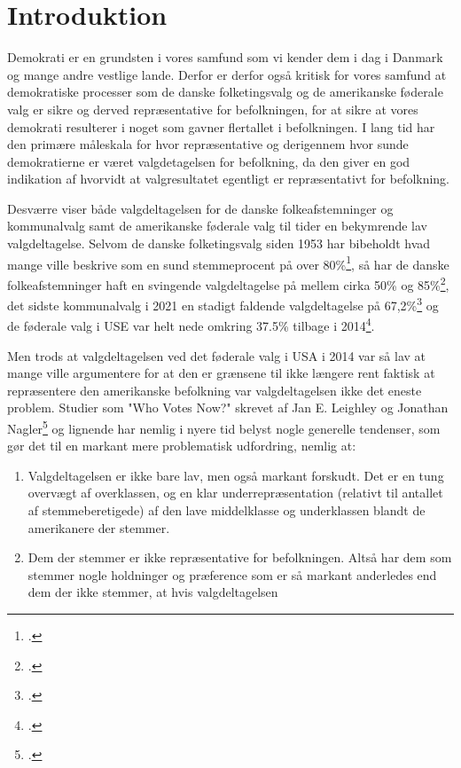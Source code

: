 \documentclass[a4paper, 8pt, oneside]{article} %
\begin{document}
\newpage

\section{Introduktion}
\label{Introduktion}
Demokrati er en grundsten i vores samfund som vi kender dem i dag i Danmark og mange andre vestlige lande. Derfor er derfor også kritisk for vores samfund at demokratiske processer som de danske folketingsvalg og de amerikanske føderale valg er sikre og derved repræsentative for befolkningen, for at sikre at vores demokrati resulterer i noget som gavner flertallet i befolkningen. I lang tid har den primære måleskala for hvor repræsentative og derigennem hvor sunde demokratierne er været valgdetagelsen for befolkning, da den giver en god indikation af hvorvidt at valgresultatet egentligt er repræsentativt for befolkning.

Desværre viser både valgdeltagelsen for de danske folkeafstemninger og kommunalvalg samt de amerikanske føderale valg til tider en bekymrende lav valgdeltagelse. Selvom de danske folketingsvalg siden 1953 har bibeholdt hvad mange ville beskrive som en sund stemmeprocent på over 80\%\footcite{clemmensen_folketingsvalgene_nodate}, så har de danske folkeafstemninger haft en svingende valgdeltagelse på mellem cirka 50\% og 85\%\footcite{clemmensen_folkeafstemninger_1953}, det sidste kommunalvalg i 2021 en stadigt faldende valgdeltagelse på 67,2\%\footcite{november_2021_stemmeprocent_2021} og de føderale valg i USE var helt nede omkring 37.5\% tilbage i 2014\footcite{noauthor_voter_nodate}.

Men trods at valgdeltagelsen ved det føderale valg i USA i 2014 var så lav at mange ville argumentere for at den er grænsene til ikke længere rent faktisk at repræsentere den amerikanske befolkning var valgdeltagelsen ikke det eneste problem. Studier som "Who Votes Now?" skrevet af Jan E. Leighley og Jonathan Nagler\footcite{leighley_who_2013} og lignende har nemlig i nyere tid belyst nogle generelle tendenser, som gør det til en markant mere problematisk udfordring, nemlig at:

\begin{enumerate}
	\item Valgdeltagelsen er ikke bare lav, men også markant forskudt. Det er en tung overvægt af overklassen, og en klar underrepræsentation (relativt til antallet af stemmeberetigede) af den lave middelklasse og underklassen blandt de amerikanere der stemmer.
	\item Dem der stemmer er ikke repræsentative for befolkningen. Altså har dem som stemmer nogle holdninger og præference som er så markant anderledes end dem der ikke stemmer, at hvis valgdeltagelsen 
\end{enumerate}
\end{document}
